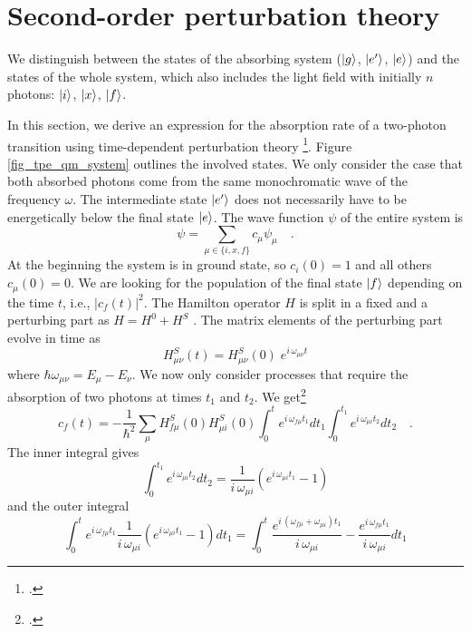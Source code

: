 \section{Second-order perturbation theory}

\begin{marginfigure}

\caption{
We distinguish between the states of the absorbing system
($\ket{g}$, $\ket{e'}$, $\ket{e}$) and the states of the whole system, which
also includes the light field with initially $n$ photons: $\ket{i}$, $\ket{x}$, $\ket{f}$. }
\label{fig_tpe_qm_system}
\end{marginfigure}

In this section, we derive an expression for
the absorption rate of a two-photon transition using 
time-dependent perturbation theory
\footcite{Haken_wolf_II,mystre_quantum_optics}.
Figure \ref{fig_tpe_qm_system} outlines the involved
states. We only  consider the case
that both absorbed photons come from the same monochromatic
wave of the frequency $\omega$. The intermediate state 
$\ket{e'}$
does not necessarily have to be energetically below the final state $\ket{e}$.
The wave function $\psi$ of the entire system is
\begin{equation}
\psi = \sum_{\mu \in \{i, x, f\}} c_{\mu} \psi_{\mu} \quad.
\end{equation}
At the beginning the system is in ground state, so $c_i(0)
= 1$ and all others $c_{\mu}(0) = 0$. We are looking for the population
of the final state $\ket{f}$ depending on the time $t$, i.e.,
$|c_f(t)|^2$. The Hamilton operator $H$ is split in a fixed and a perturbing part as
 $H = H^0 + H^S$ . 
The matrix elements of the perturbing part evolve in time as
\begin{equation}
H^S_{\mu \nu} (t) = H^S_{\mu \nu} (0) \; e^{i \, \omega_{\mu \nu}
t}
\end{equation}
where $\hbar \omega_{\mu \nu} = E_{\mu} - E_{\nu}$.
We now only consider processes that require the absorption of two photons at times $t_1$ and $t_2$. We get\footcite{Haken_wolf_II}
\begin{equation}
c_f(t) = - \frac{1}{\hbar^2} \sum_{\mu} H^S_{f \mu} (0) H^S_{\mu
i} (0)\int_0^t e^{i \,\omega_{f \mu} t_1} dt_1 \int_0^{t_1} e^{i
\,\omega_{\mu i} t_2} dt_2 \quad .
\end{equation}
The inner integral gives
\begin{equation}
\int_0^{t_1} e^{i \,\omega_{\mu i} t_2} dt_2 =
\frac{1}{i \,\omega_{\mu i}} \left( e^{i \,\omega_{\mu i} t_1} -1
\right)
\end{equation}
and the outer integral
\begin{equation}
\int_0^t e^{i \,\omega_{f \mu} t_1} \frac{1}{i \,\omega_{\mu i}}
\left( e^{i \,\omega_{\mu i} t_1} -1 \right) dt_1 = %
\int_0^t  \frac{e^{i \,(\omega_{f \mu}+\omega_{ \mu i}) t_1}}{i
\,\omega_{\mu i}} %
-   \frac{e^{i \,\omega_{ f \mu } t_1}}{i \,\omega_{\mu i}} dt_1
\end{equation}

